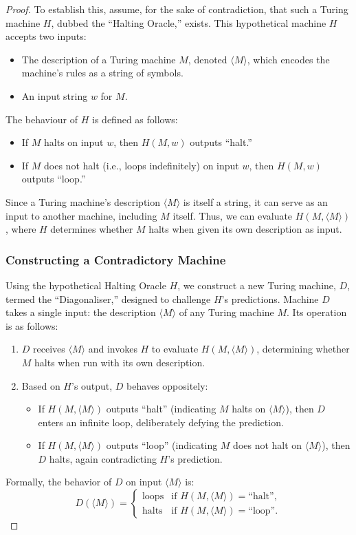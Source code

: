 \begin{proof}
To establish this, assume, for the sake of contradiction, that such a Turing machine $H$, dubbed the ``Halting Oracle,'' exists. This hypothetical machine $H$ accepts two inputs:
\begin{itemize}
    \item The description of a Turing machine $M$, denoted $\langle M \rangle$, which encodes the machine's rules as a string of symbols.
    \item An input string $w$ for $M$.
\end{itemize}
The behaviour of $H$ is defined as follows:
\begin{itemize}
    \item If $M$ halts on input $w$, then $H(M, w)$ outputs ``halt.''
    \item If $M$ does not halt (i.e., loops indefinitely) on input $w$, then $H(M, w)$ outputs ``loop.''
\end{itemize}

Since a Turing machine's description $\langle M \rangle$ is itself a string, it can serve as an input to another machine, including $M$ itself. Thus, we can evaluate $H(M, \langle M \rangle)$, where $H$ determines whether $M$ halts when given its own description as input.

\subsubsection*{Constructing a Contradictory Machine}
Using the hypothetical Halting Oracle $H$, we construct a new Turing machine, $D$, termed the ``Diagonaliser,'' designed to challenge $H$'s predictions. Machine $D$ takes a single input: the description $\langle M \rangle$ of any Turing machine $M$. Its operation is as follows:
\begin{enumerate}
    \item $D$ receives $\langle M \rangle$ and invokes $H$ to evaluate $H(M, \langle M \rangle)$, determining whether $M$ halts when run with its own description.
    \item Based on $H$'s output, $D$ behaves oppositely:
        \begin{itemize}
            \item If $H(M, \langle M \rangle)$ outputs ``halt'' (indicating $M$ halts on $\langle M \rangle$), then $D$ enters an infinite loop, deliberately defying the prediction.
            \item If $H(M, \langle M \rangle)$ outputs ``loop'' (indicating $M$ does not halt on $\langle M \rangle$), then $D$ halts, again contradicting $H$'s prediction.
        \end{itemize}
\end{enumerate}
Formally, the behavior of $D$ on input $\langle M \rangle$ is:
\[
D(\langle M \rangle) =
\begin{cases}
\text{loops} & \text{if } H(M, \langle M \rangle) = \text{``halt''}, \\
\text{halts} & \text{if } H(M, \langle M \rangle) = \text{``loop''}.
\end{cases}
\]


\end{proof}
